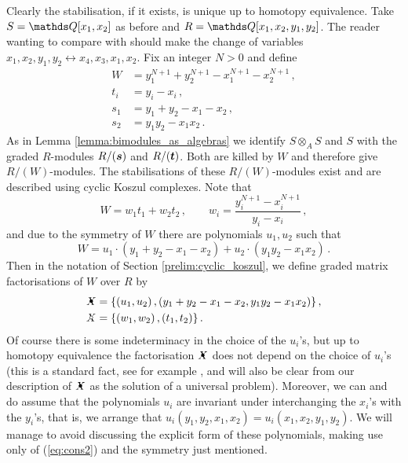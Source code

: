 \documentclass{compositio}
\theoremstyle{definition}
\numberwithin{equation}{section}
\begin{document}
Clearly the stabilisation, if it exists, is unique up to homotopy equivalence. Take $S = \QQ[x_1,x_2]$ as before and $R = \QQ[x_1,x_2,y_1,y_2]$. The reader wanting to compare with \cite[Section 6]{kr0401268} should make the change of variables $x_1,x_2,y_1,y_2 \longleftrightarrow x_4,x_3,x_1,x_2$. Fix an integer $N > 0$ and define
\begin{align*}
W &= y_1^{N+1} + y_2^{N+1} - x_1^{N+1} - x_2^{N+1}\,,\\
t_i &= y_i - x_i\,,\\
s_1 &= y_1 + y_2 - x_1 - x_2\,,\\
s_2 &= y_1 y_2 - x_1 x_2\,.
\end{align*}
As in Lemma \ref{lemma:bimodules_as_algebras} we identify $S \otimes_A S$ and $S$ with the graded $R$-modules $R/(\boldsymbol{s})$ and $R/(\boldsymbol{t})$. Both are killed by $W$ and therefore give $R/(W)$-modules. The stabilisations of these $R/(W)$-modules exist and are described using cyclic Koszul complexes. Note that
\begin{equation}\label{eq:cons1}
W = w_1 t_1 + w_2 t_2 \, , \qquad w_i = \frac{y_i^{N+1} - x_i^{N+1}}{y_i - x_i} \, ,
\end{equation}
and due to the symmetry of $W$ there are polynomials $u_1,u_2$ such that
\begin{equation}\label{eq:cons2}
W = u_1 \cdot ( y_1 + y_2 - x_1 - x_2 ) + u_2 \cdot ( y_1 y_2 - x_1 x_2 ) \, .
\end{equation}
Then in the notation of Section \ref{prelim:cyclic_koszul}, we define graded matrix factorisations of $W$ over $R$ by
\begin{align}
\Xbul &= \{ (u_1, u_2)\, , (y_1 + y_2 - x_1 - x_2, y_1 y_2 - x_1 x_2) \} \, , \nonumber \\
\Xcirc &= \{ (w_1, w_2) \, , (t_1, t_2) \}\,. \label{XbulXcirc}
\end{align}
Of course there is some indeterminacy in the choice of the $u_i$'s, but up to homotopy equivalence the factorisation $\Xbul$ does not depend on the choice of $u_i$'s (this is a standard fact, see for example \cite{??}, and will also be clear from our description of $\Xbul$ as the solution of a universal problem). Moreover, we can and do assume that the polynomials $u_i$ are invariant under interchanging the $x_{i}$'s with the $y_{i}$'s, that is, we arrange that $u_i(y_1,y_2,x_1,x_2) = u_i(x_1,x_2,y_1,y_2)$. We will manage to avoid discussing the explicit form of these polynomials, making use only of (\ref{eq:cons2}) and the symmetry just mentioned.
\end{document}
